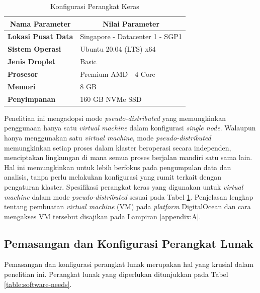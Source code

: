 \begin{table}[h!]
	\centering
	\caption{Konfigurasi Perangkat Keras}
	\begin{tabular}{|ll|}
		\hline
		\multicolumn{1}{|c|}{\textbf{Nama Parameter}}    & \multicolumn{1}{c|}{\textbf{Nilai Parameter}} \\ \hline
		\multicolumn{1}{|l|}{\textbf{Lokasi Pusat Data}} & Singapore - Datacenter 1 - SGP1               \\ \hline
		\multicolumn{1}{|l|}{\textbf{Sistem Operasi}}    & Ubuntu 20.04 (LTS) x64                        \\ \hline
		\multicolumn{1}{|l|}{\textbf{Jenis Droplet}}     & Basic                                         \\ \hline
		\multicolumn{1}{|l|}{\textbf{Prosesor}}          & Premium AMD - 4 Core                          \\ \hline
		\multicolumn{1}{|l|}{\textbf{Memori}}            & 8 GB                                          \\ \hline
		\multicolumn{1}{|l|}{\textbf{Penyimpanan}}       & 160 GB NVMe SSD                               \\ \hline
	\end{tabular}
	\label{table:conf-hardware}
\end{table}

Penelitian ini mengadopsi mode \textit{pseudo-distributed} yang memungkinkan penggunaan hanya satu \textit{virtual machine} dalam konfigurasi \textit{single node}. Walaupun hanya menggunakan satu \textit{virtual machine}, mode \textit{pseudo-distributed} memungkinkan setiap proses dalam klaster beroperasi secara independen, menciptakan lingkungan di mana semua proses berjalan mandiri satu sama lain. Hal ini memungkinkan untuk lebih berfokus pada pengumpulan data dan analisis, tanpa perlu melakukan konfigurasi yang rumit terkait dengan pengaturan klaster. Spesifikasi perangkat keras yang digunakan untuk \textit{virtual machine} dalam mode \textit{pseudo-distributed} sesuai pada Tabel \ref{table:conf-hardware}. Penjelasan lengkap tentang pembuatan \textit{virtual machine} (VM) pada \textit{platform} DigitalOcean dan cara mengakses VM tersebut disajikan pada Lampiran \ref{appendix:A}.

\subsection{Pemasangan dan Konfigurasi Perangkat Lunak}
Pemasangan dan konfigurasi perangkat lunak merupakan hal yang krusial dalam penelitian ini. Perangkat lunak yang diperlukan ditunjukkan pada Tabel \ref{table:software-needs}.

